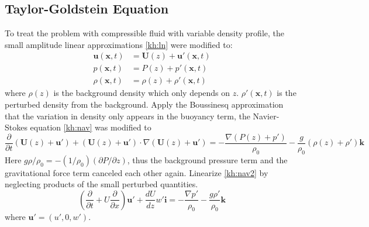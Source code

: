 \subsection{Taylor-Goldstein Equation} To treat the problem with
compressible fluid with variable density profile, the small
amplitude linear approximations \eqref{kh:ln} were modified to:
\begin{subequations}\label{kh:st}
\begin{align}
    \mathbf{u}(\mathbf{x},t)&=\mathbf{U}(z)+\mathbf{u}'(\mathbf{x},t)\label{kn:stu}\\
    p(\mathbf{x},t)&=P(z)+p'(\mathbf{x},t)\label{kn:stp}\\
    \rho(\mathbf{x},t)&=\rho(z)+\rho'(\mathbf{x},t)\label{kn:strho}
\end{align}
\end{subequations}
where $\rho(z)$ is the background density which only depends on $z$.
$\rho'(\mathbf{x},t)$ is the perturbed density from the background.
\newslide
Apply the Boussinesq approximation that the variation in density
only appears in the buoyancy term, the Navier-Stokes equation
\eqref{kh:nav} was modified to
\begin{equation}\label{kh:nav2}
\frac{\partial}{\partial
t}(\mathbf{U}(z)+\mathbf{u}')+(\mathbf{U}(z)+\mathbf{u}')
\cdot\nabla(\mathbf{U}(z)+\mathbf{u}')=-\frac{\nabla(P(z)+p')}{\rho_0}
-\frac{g}{\rho_0}(\rho(z)+\rho')\mathbf{k}
\end{equation}
Here $g\rho/\rho_0=-(1/\rho_0)(\partial P/\partial z)$, thus the
background pressure term and the gravitational force term canceled
each other again.
\newslide
Linearize \eqref{kh:nav2} by neglecting products of the small
perturbed quantities.
\begin{equation}\label{kh:str}
(\frac{\partial}{\partial t}+U\frac{\partial}{\partial
x})\mathbf{u}'+\frac{dU}{dz}w'\mathbf{i}=-\frac{\nabla
p'}{\rho_0}-\frac{g\rho'}{\rho_0}\mathbf{k}
\end{equation}
where $\mathbf{u}' = (u',0,w')$.

